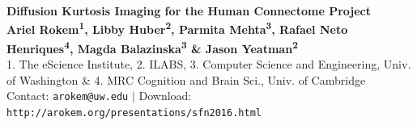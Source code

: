 \documentclass[a0, landscape]{a0poster}
\begin{document}


\begin{minipage}[b]{0.85\linewidth}
\veryHuge \color{NavyBlue} \textbf{Diffusion Kurtosis Imaging for the Human Connectome Project} \color{Black}\\ %
\huge \textbf{Ariel Rokem\textsuperscript{1}, Libby Huber\textsuperscript{2}, Parmita Mehta\textsuperscript{3}, Rafael Neto Henriques\textsuperscript{4}, Magda Balazinska\textsuperscript{3} \& Jason Yeatman\textsuperscript{2}}\\ %
\Large 1. The eScience Institute, 2. ILABS, 3. Computer Science and Engineering, Univ. of Washington \& 4. MRC Cognition and Brain Sci., Univ. of Cambridge\\ %
\Large Contact: \texttt{arokem@uw.edu} $|$ Download: \texttt{http://arokem.org/presentations/sfn2016.html}
\end{minipage}
%
%
\end{document}
